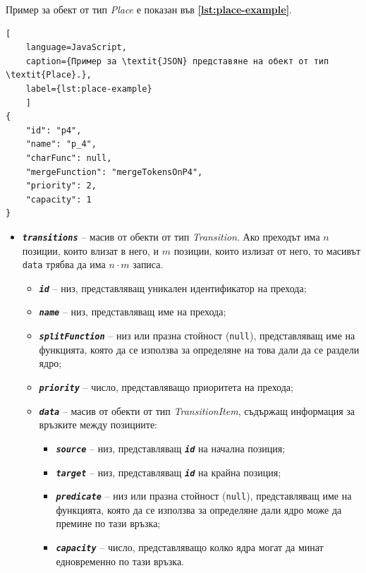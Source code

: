 Пример за обект от тип \textit{Place} е показан във \textbf{\autoref{lst:place-example}}.
\begin{lstlisting}[
	language=JavaScript,
	caption={Пример за \textit{JSON} представяне на обект от тип \textit{Place}.},
	label={lst:place-example}
	]
{
    "id": "p4",
    "name": "p_4",
    "charFunc": null,
    "mergeFunction": "mergeTokensOnP4",
    "priority": 2,
    "capacity": 1
}
\end{lstlisting}

\vspace{-10pt}
\begin{itemize}
\item \texttt{\textbf{\textit{transitions}}} -- масив от обекти от тип \textit{Transition}. Ако преходът има $n$ позиции, които влизат в него, и $m$ позиции, които излизат от него, то масивът \texttt{data} трябва да има $n \cdot m$ записа.
\begin{itemize}
\item \texttt{\textbf{\textit{id}}} -- низ, представляващ уникален идентификатор на прехода;
\item \texttt{\textbf{\textit{name}}} -- низ, представляващ име на прехода;
\item \texttt{\textbf{\textit{splitFunction}}} -- низ или празна стойност (\texttt{null}), представляващ име на функцията, която да се използва за определяне на това дали да се раздели ядро;
\item \texttt{\textbf{\textit{priority}}} -- число, представляващо приоритета на прехода;
\item \texttt{\textbf{\textit{data}}} -- масив от обекти от тип \textit{TransitionItem}, съдържащ информация за връзките между позициите:
\begin{itemize}
\item \texttt{\textbf{\textit{source}}} -- низ, представляващ \texttt{\textbf{\textit{id}}} на начална позиция;
\item \texttt{\textbf{\textit{target}}} -- низ, представляващ \texttt{\textbf{\textit{id}}} на крайна позиция;
\item \texttt{\textbf{\textit{predicate}}} -- низ или празна стойност (\texttt{null}), представляващ име на функцията, която да се използва за определяне дали ядро може да премине по тази връзка;
\item \texttt{\textbf{\textit{capacity}}} -- число, представляващо колко ядра могат да минат едновременно по тази връзка.
\end{itemize}
\end{itemize}
\end{itemize}

